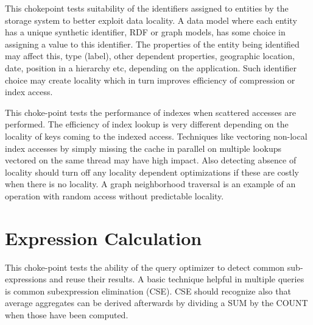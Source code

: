 


This chokepoint tests suitability of the identifiers assigned to entities by the storage system to better exploit data locality. A data model where each entity has a unique synthetic identifier,
\eg RDF or graph models, has some choice in assigning a value to this identifier. The properties of the entity being identified may affect this, \eg type (label), other dependent properties,
\eg geographic location, date, position in a hierarchy etc, depending on the application. Such identifier choice may create locality which in turn improves efficiency of compression or index access.




This choke-point tests the performance of indexes when scattered accesses are performed. The efficiency of index lookup is very different depending on the locality of keys coming to the indexed access.
Techniques like vectoring non-local index accesses by simply missing the cache in parallel on multiple lookups vectored on the same thread may have high impact.
Also detecting absence of locality should turn off any locality dependent optimizations if these are costly when there is no locality. A graph neighborhood traversal is an example of an operation with random access without predictable locality.




\section{Expression Calculation}


This choke-point tests the ability of the query optimizer to detect common sub-expressions and reuse their results. A basic technique helpful in multiple queries is common subexpression elimination (CSE).
CSE should recognize also that average aggregates can be derived afterwards by dividing a SUM by the COUNT when those have been computed.

